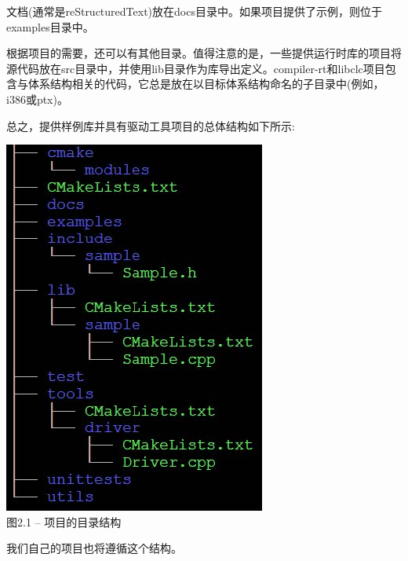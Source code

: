 文档(通常是reStructuredText)放在docs目录中。如果项目提供了示例，则位于examples目录中。\par

根据项目的需要，还可以有其他目录。值得注意的是，一些提供运行时库的项目将源代码放在src目录中，并使用lib目录作为库导出定义。compiler-rt和libclc项目包含与体系结构相关的代码，它总是放在以目标体系结构命名的子目录中(例如，i386或ptx)。\par

总之，提供样例库并具有驱动工具项目的总体结构如下所示:\par

\hspace*{\fill} \par %
\begin{center}
	\includegraphics{content/1/chapter2/images/1.jpg}\\
	图2.1 – 项目的目录结构
\end{center}

我们自己的项目也将遵循这个结构。\par









